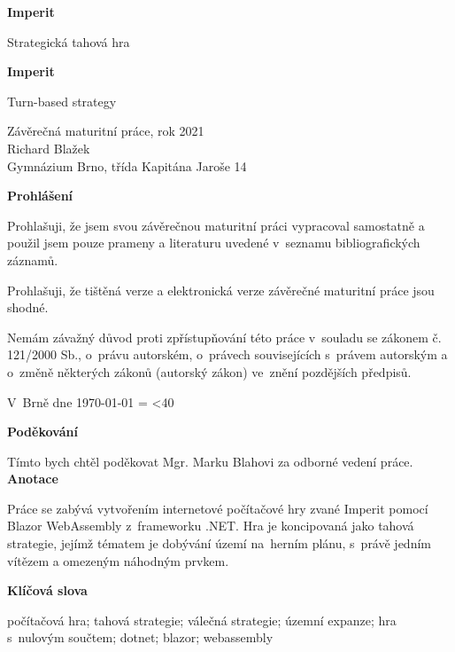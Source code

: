 \documentclass[a4paper,12pt]{article}
\author{Richard Blažek}
\makeatletter
\newcommand{\repeatchar}[2]{%
  \begingroup
  \my@repeat@count=\z@
  \@whilenum\my@repeat@count<#1\do{#2\advance\my@repeat@count\@ne}%
  \endgroup
}
\makeatother
\begin{document}
\begin{titlepage}
    \begin{center}

	\vspace*{3cm}            
	\Huge
	\textbf{Imperit}
            
	\vspace{0.5cm}
	\LARGE
	Strategická tahová hra
        
	\vspace*{1cm}
	\Huge
	\textbf{Imperit}
            
	\vspace{0.5cm}
	\LARGE
	Turn-based strategy
            
	\vfill
            
	\large
        Závěrečná maturitní práce, rok 2021\\
	Richard Blažek\\
	Gymnázium Brno, třída Kapitána Jaroše 14
    \end{center}
\end{titlepage}
\thispagestyle{empty}
\Large\textbf{Prohlášení}\normalsize

Prohlašuji, že jsem svou závěrečnou maturitní práci vypracoval samostatně a použil jsem pouze prameny a literaturu uvedené v~seznamu bibliografických záznamů.

Prohlašuji, že tištěná verze a elektronická verze závěrečné maturitní práce jsou shodné.

Nemám závažný důvod proti zpřístupňování této práce v~souladu se zákonem č. 121/2000 Sb., o~právu autorském, o~právech souvisejících s~právem autorským a o~změně některých zákonů (autorský zákon) ve~znění pozdějších předpisů. 

V~Brně dne \today{} \repeatchar{40}{.}
\newpage
\thispagestyle{empty}
\Large\textbf{Poděkování}\normalsize

Tímto bych chtěl poděkovat Mgr. Marku Blahovi za odborné vedení práce.
\newpage
\thispagestyle{empty}
\Large\textbf{Anotace}\normalsize

Práce se zabývá vytvořením internetové počítačové hry zvané Imperit pomocí Blazor WebAssembly z~frameworku .NET. Hra je koncipovaná jako tahová strategie, jejímž tématem je dobývání území na~herním plánu, s~právě jedním vítězem a omezeným náhodným prvkem.

\Large\textbf{Klíčová slova}\normalsize

počítačová hra; tahová strategie; válečná strategie; územní expanze; hra s~nulovým součtem;\- dotnet; blazor; webassembly
\end{document}
